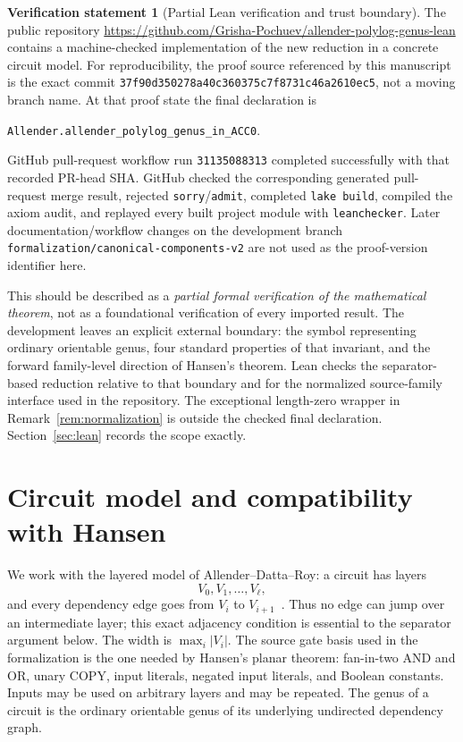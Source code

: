\documentclass[11pt]{article}
\theoremstyle{definition}
\newtheorem{verification}[theorem]{Verification statement}
\begin{document}
\begin{verification}[Partial Lean verification and trust boundary]\label{ver:scope}
The public repository
\url{https://github.com/Grisha-Pochuev/allender-polylog-genus-lean}
contains a machine-checked implementation of the new reduction in a concrete
circuit model.  For reproducibility, the proof source referenced by this
manuscript is the exact commit
\nolinkurl{37f90d350278a40c360375c7f8731c46a2610ec5}, not a moving branch name.
At that proof state the final declaration is\par\smallskip\noindent
\nolinkurl{Allender.allender_polylog_genus_in_ACC0}.\par\smallskip
GitHub pull-request workflow run \texttt{31135088313} completed successfully
with that recorded PR-head SHA.  GitHub checked the corresponding generated
pull-request merge result, rejected \texttt{sorry}/\texttt{admit}, completed
\texttt{lake build}, compiled the axiom audit, and replayed every built project
module with \texttt{leanchecker}.  Later documentation/workflow changes on the development branch
\nolinkurl{formalization/canonical-components-v2} are not used as the
proof-version identifier here.

This should be described as a \emph{partial formal verification of the
mathematical theorem}, not as a foundational verification of every imported
result.  The development leaves an explicit external boundary: the symbol
representing ordinary orientable genus, four standard properties of that
invariant, and the forward family-level direction of Hansen's theorem.  Lean
checks the separator-based reduction relative to that boundary and for the
normalized source-family interface used in the repository.  The exceptional
length-zero wrapper in Remark~\ref{rem:normalization} is outside the checked
final declaration.  Section~\ref{sec:lean} records the scope exactly.
\end{verification}

\section{Circuit model and compatibility with Hansen}\label{sec:model}

We work with the layered model of Allender--Datta--Roy: a circuit has layers
\[
  V_0,V_1,\ldots,V_\ell,
\]
and every dependency edge goes from $V_i$ to $V_{i+1}$~\cite{ADR2005,ECCC2004}.
Thus no edge can jump over an intermediate layer; this exact adjacency
condition is essential to the separator argument below.  The width is
$\max_i |V_i|$.  The source gate basis used in the formalization is the one
needed by Hansen's planar theorem: fan-in-two AND and OR, unary COPY, input
literals, negated input literals, and Boolean constants.  Inputs may be used on
arbitrary layers and may be repeated.  The genus of a circuit is the ordinary
orientable genus of its underlying undirected dependency graph.
\end{document}
